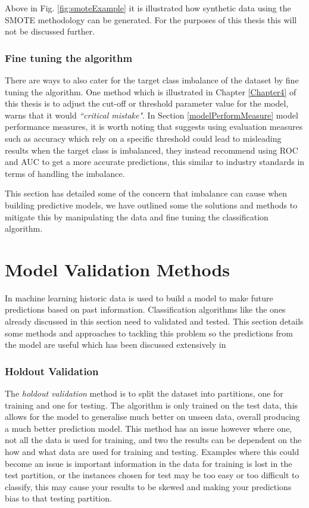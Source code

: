 Above in Fig. \ref{fig:smoteExample} it is illustrated how synthetic data using the SMOTE methodology can be generated. For the purposes of this thesis this will not be discussed further.

\subsubsection{Fine tuning the algorithm}
There are ways to also cater for the target class imbalance of the dataset by fine tuning the algorithm. One method which is illustrated in Chapter \ref{Chapter4} of this thesis is to adjust the cut-off or threshold parameter value for the model, \cite{provost_machine_2000} warns that it would \textit{``critical mistake"}. In Section \ref{modelPerformMeasure} model performance measures, it is  worth noting that \cite{chawla_editorial:_2004} suggests using evaluation measures such as accuracy which rely on a specific threshold could lead to misleading results when the target class is imbalanced, they instead recommend using ROC and AUC to get a more accurate predictions, this similar to industry standards in terms of handling the imbalance.

This section has detailed some of the concern that imbalance can cause when building predictive models, we have outlined some the solutions and methods to mitigate this by manipulating the data and fine tuning the classification algorithm.


\section{Model Validation Methods}\label{sec:modelValid}
In machine learning historic data is used to build a model to make future predictions based on past information. Classification algorithms like the ones already discussed in this section need to validated and tested. This section details some methods and approaches to tackling this problem so the predictions from the model are useful which has been discussed extensively in \citep{refaeilzadeh_cross-validation_2009}

\subsubsection{Holdout Validation}
The \textit{holdout validation} method is to split the dataset into partitions, one for training and one for testing. The algorithm is only trained on the test data, this allows for the model to generalise much better on unseen data, overall producing a much better prediction model. This method has an issue however where one, not all the data is used for training, and two the results can be dependent on the how and what data are used for training and testing. Examples where this could become an issue is important information in the data for training is lost in the test partition, or the instances chosen for test may be too easy or too difficult to classify, this may cause your results to be skewed and making your predictions bias to that testing partition. 

